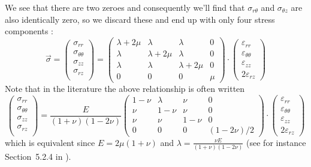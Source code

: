 We see that there are two zeroes and consequently we'll find that $\sigma_{r\theta}$ and $\sigma_{\theta z}$ are also
identically zero, so we discard these and end up with only four stress components :
\[
\vec{\sigma}=
\left(
\begin{array}{c}
\sigma_{rr} \\
\sigma_{\theta\theta} \\
\sigma_{zz} \\
\sigma_{rz} \\
\end{array}
\right)
=
\left(
\begin{array}{cccc}
\lambda+2\mu & \lambda & \lambda & 0  \\
\lambda & \lambda+2\mu & \lambda & 0  \\
\lambda & \lambda & \lambda+2\mu & 0  \\
0 & 0 & 0 & \mu 
\end{array}
\right)
\cdot
\left(
\begin{array}{c}
\varepsilon_{rr} \\
\varepsilon_{\theta\theta} \\
\varepsilon_{zz} \\
2\varepsilon_{rz} 
\end{array}
\right)
\]
Note that in the literature the above relationship is often written 
\[
\left(
\begin{array}{c}
\sigma_{rr} \\
\sigma_{\theta\theta} \\
\sigma_{zz} \\
\sigma_{rz} \\
\end{array}
\right)
=
\frac{E}{(1+\nu)(1-2\nu)}
\left(
\begin{array}{cccc}
1-\nu & \lambda & \nu & 0  \\
\nu & 1-\nu & \nu & 0  \\
\nu & \nu & 1-\nu & 0  \\
0 & 0 & 0 & (1-2\nu)/2
\end{array}
\right)
\cdot
\left(
\begin{array}{c}
\varepsilon_{rr} \\
\varepsilon_{\theta\theta} \\
\varepsilon_{zz} \\
2\varepsilon_{rz} 
\end{array}
\right)
\]
which is equivalent since $E=2\mu(1+\nu)$ and $\lambda=\frac{\nu E}{(1+\nu)(1-2\nu)}$ (see for instance Section~5.2.4 in \cite{zita1}).   

